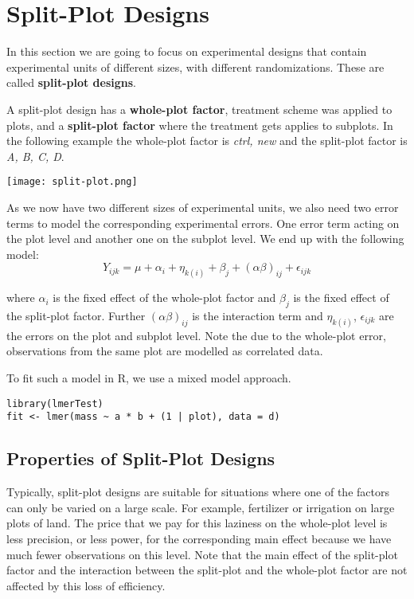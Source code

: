 \section{Split-Plot Designs}

In this section we are going to focus on experimental designs that contain experimental units of different sizes, with different randomizations. These are called \textbf{split-plot designs}. \medskip

A split-plot design has a \textbf{whole-plot factor}, treatment scheme was applied to plots, and a \textbf{split-plot factor} where the treatment gets applies to subplots. In the following example the whole-plot factor is \textit{ctrl, new} and the split-plot factor is \textit{A, B, C, D}.

\begin{center}
	\texttt{[image: split-plot.png]}
\end{center}

As we now have two different sizes of experimental units, we also need two error terms to model the corresponding experimental errors. One error term acting on the plot level and another one on the subplot level. We end up with the following model:
$$Y_{ijk} = \mu + \alpha_i + \eta_{k(i)} + \beta_j + (\alpha \beta)_{ij} + \epsilon_{ijk}$$

where $\alpha_i$ is the fixed effect of the whole-plot factor and $\beta_{j}$ is the fixed effect of the split-plot factor. Further $(\alpha \beta)_{ij}$ is the interaction term and $\eta_{k(i)}$, $\epsilon_{ijk}$ are the errors on the plot and subplot level. Note the due to the whole-plot error, observations from the same plot are modelled as correlated data. \medskip

To fit such a model in R, we use a mixed model approach.
\begin{lstlisting}
library(lmerTest)
fit <- lmer(mass ~ a * b + (1 | plot), data = d)
\end{lstlisting}


\subsection{Properties of Split-Plot Designs}

Typically, split-plot designs are suitable for situations where one of the factors can only be varied on a large scale. For example, fertilizer or irrigation on large plots of land. The price that we pay for this laziness on the whole-plot level is less precision, or less power, for the corresponding main effect because we have much fewer observations on this level. Note that the main effect of the split-plot factor and the interaction between the split-plot and the whole-plot factor are not affected by this loss of efficiency. \medskip

